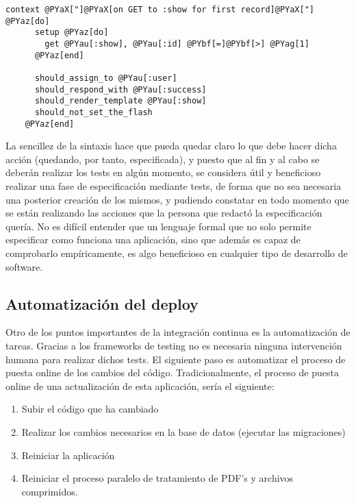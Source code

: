 \begin{Verbatim}[commandchars=@\[\]]
	context @PYaX["]@PYaX[on GET to :show for first record]@PYaX["] @PYaz[do]
	  setup @PYaz[do]
	    get @PYau[:show], @PYau[:id] @PYbf[=]@PYbf[>] @PYag[1]
	  @PYaz[end]

	  should_assign_to @PYau[:user]
	  should_respond_with @PYau[:success]
	  should_render_template @PYau[:show]
	  should_not_set_the_flash
	@PYaz[end]
\end{Verbatim}


La sencillez de la sintaxis hace que pueda quedar claro lo que debe hacer dicha acción (quedando, por tanto, especificada), y puesto que al fin y al cabo se deberán realizar los tests en algún momento, se considera útil y beneficioso realizar una fase de especificación mediante tests, de forma que no sea necesaria una posterior creación de los mismos, y pudiendo constatar en todo momento que se están realizando las acciones que la persona que redactó la especificación quería. No es difícil entender que un lenguaje formal que no solo permite especificar como funciona una aplicación, sino que además es capaz de comprobarlo empíricamente, es algo beneficioso en cualquier tipo de desarrollo de software.



\subsection{Automatización del deploy} %
\label{sub:automatización_del_deploy}

Otro de los puntos importantes de la integración continua es la automatización de tareas. Gracias a los frameworks de testing no es necesaria ninguna intervención humana para realizar dichos tests. El siguiente paso es automatizar el proceso de puesta online de los cambios del código. Tradicionalmente, el proceso de puesta online de una actualización de esta aplicación, sería el siguiente:

\begin{enumerate}
	\item Subir el código que ha cambiado
	\item Realizar los cambios necesarios en la base de datos (ejecutar las migraciones)
	\item Reiniciar la aplicación
	\item Reiniciar el proceso paralelo de tratamiento de PDF's y archivos comprimidos.
\end{enumerate}

